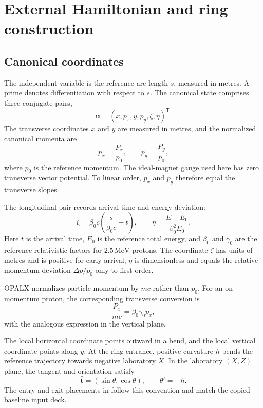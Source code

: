 \documentclass[11pt,a4paper]{article}
\numberwithin{equation}{section}
\newcommand{\units}[1]{\,\mathrm{#1}}
\newcommand{\mat}[1]{\mathsf{#1}}
\begin{document}
\section{External Hamiltonian and ring construction}
\label{sec:hamiltonian}

\subsection{Canonical coordinates}

The independent variable is the reference arc length $s$, measured in
metres. A prime denotes differentiation with respect to $s$. The canonical
state comprises three conjugate pairs,
\begin{equation}
  \mathbf u=(x,p_x,y,p_y,\zeta,\eta)^{\mat T}.
  \label{eq:state}
\end{equation}
The transverse coordinates $x$ and $y$ are measured in metres, and the
normalized canonical momenta are
\begin{equation}
  p_x=\frac{P_x}{p_0},\qquad p_y=\frac{P_y}{p_0},
  \label{eq:momentum}
\end{equation}
where $p_0$ is the reference momentum. The ideal-magnet gauge used here
has zero transverse vector potential. To linear order, $p_x$ and $p_y$
therefore equal the transverse slopes.

The longitudinal pair records arrival time and energy deviation:
\begin{equation}
  \zeta=\beta_0c\left(\frac{s}{\beta_0c}-t\right),\qquad
  \eta=\frac{E-E_0}{\beta_0^2E_0}.
  \label{eq:longitudinal}
\end{equation}
Here $t$ is the arrival time, $E_0$ is the reference total energy, and
$\beta_0$ and $\gamma_0$ are the reference relativistic factors for
$2.5\units{MeV}$ protons. The coordinate $\zeta$ has units of metres and
is positive for early arrival; $\eta$ is dimensionless and equals the
relative momentum deviation $\Delta p/p_0$ only to first order.

OPALX normalizes particle momentum by $mc$ rather than $p_0$. For an
on-momentum proton, the corresponding transverse conversion is
\begin{equation}
  \frac{P_x}{mc}=\beta_0\gamma_0p_x,
  \label{eq:opalx-momentum}
\end{equation}
with the analogous expression in the vertical plane.

The local horizontal coordinate points outward in a bend, and the local
vertical coordinate points along $y$. At the ring entrance, positive
curvature $h$ bends the reference trajectory towards negative laboratory
$X$. In the laboratory $(X,Z)$ plane, the tangent and orientation satisfy
\begin{equation}
  \hat{\mathbf t}=(\sin\theta,\cos\theta),\qquad \theta'=-h.
  \label{eq:geometry}
\end{equation}
The entry and exit placements in  follow this
convention and match the copied baseline input deck.
\end{document}
